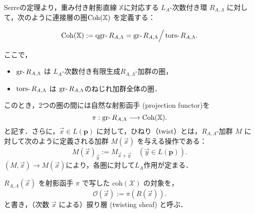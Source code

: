 \begin{defn}\cite{GL87}
	Serreの定理より，重み付き射影直線 $\mathbb{X}$に対応する $L_A$-次数付き環 $R_{A,\Lambda}$ に対して，次のように連接層の圏$\operatorname{\mathrm{Coh}}(\mathbb{X})$ を定義する：

\[
\Coh(\mathbb{X}) := \qgr R_{A,\Lambda} = \gr R_{A,\Lambda}\Big{/}\tors R_{A,\Lambda}.
\]

ここで，
\begin{itemize}
	\item $\gr R_{A,\Lambda}$ は $L_A$-次数付き有限生成$R_{A,\Lambda}$-加群の圏，
	\item $\tors R_{A,\Lambda}$ は $\gr R_{A,\Lambda}$のねじれ加群全体の圏．
\end{itemize}
このとき，2つの圏の間には自然な射影函手 (projection functor)を
\[ \pi: \gr R_{A,\Lambda} \longrightarrow \Coh(\XX) .\]
と記す．さらに，$\vec{x} \in L(\mathbf{p})$ に対して，ひねり（twist）とは，$R_{A,\Lambda}$-加群 $M$ に対して次のように定義される加群 $M(\vec{x})$ を与える操作である：
\[
M(\vec{x})_{\vec{y}} := M_{\vec{x} + \vec{y}} \quad (\vec{y} \in L(\mathbf{p})).
\]
$(M,\vec{x})\to M(\vec{x})$により，各圏に対して$L_A$作用が定まる．
\end{defn}
$R_{A,\Lambda}(\vec{x})$ を射影函手 $\pi$ で写した $\mathrm{coh}(\mathcal{X})$ の対象を，
\[ \mathcal{O}(\vec{x}) := \pi(R(\vec{x})). \]
と書き，（次数 $\vec{x}$ による）捩り層 (twisting sheaf) と呼ぶ．\\

